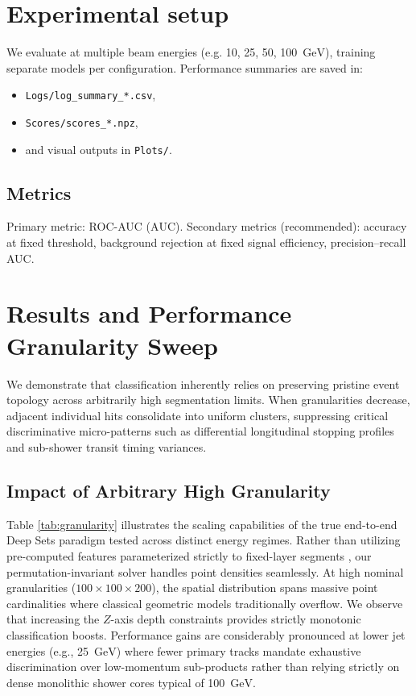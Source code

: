\documentclass[11pt,a4paper]{article}
\newcommand{\GeV}{\ensuremath{\mathrm{GeV}}\xspace}
\newcommand{\AUC}{\ensuremath{\mathrm{AUC}}\xspace}
\begin{document}
\section{Experimental setup}
\label{sec:setup}
We evaluate at multiple beam energies (e.g. 10, 25, 50, 100~\GeV), training separate models per configuration.
Performance summaries are saved in:
\begin{itemize}
    \item \texttt{Logs/log\_summary\_*.csv},
    \item \texttt{Scores/scores\_*.npz},
    \item and visual outputs in \texttt{Plots/}.
\end{itemize}

\subsection{Metrics}
Primary metric: ROC-AUC (\AUC).
Secondary metrics (recommended): accuracy at fixed threshold, background rejection at fixed signal efficiency, precision--recall AUC.

\section{Results and Performance Granularity Sweep}
\label{sec:results}

We demonstrate that classification inherently relies on preserving pristine event topology across arbitrarily high segmentation limits. When granularities decrease, adjacent individual hits consolidate into uniform clusters, suppressing critical discriminative micro-patterns such as differential longitudinal stopping profiles and sub-shower transit timing variances.

\subsection{Impact of Arbitrary High Granularity}
Table \ref{tab:granularity} illustrates the scaling capabilities of the true end-to-end Deep Sets paradigm tested across distinct energy regimes. Rather than utilizing pre-computed features parameterized strictly to fixed-layer segments \cite{particles8020058}, our permutation-invariant solver handles point densities seamlessly. At high nominal granularities ($100 \times 100 \times 200$), the spatial distribution spans massive point cardinalities where classical geometric models traditionally overflow. We observe that increasing the $Z$-axis depth constraints provides strictly monotonic classification boosts. 
Performance gains are considerably pronounced at lower jet energies (e.g., 25~\GeV) where fewer primary tracks mandate exhaustive discrimination over low-momentum sub-products rather than relying strictly on dense monolithic shower cores typical of 100~\GeV.
\end{document}

